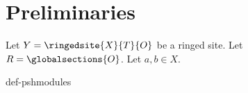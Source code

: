 \chapter{Preliminaries}

Let $Y = \ringedsite{X}{T}{O}$ be a ringed site.
Let $R = \globalsections{O}$. Let $a,b\in X$.


{def-pshmodules}
